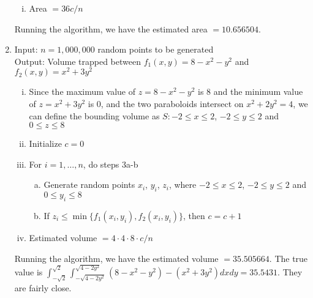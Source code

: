 \documentclass[10pt]{report}
\begin{document}
\begin{enumerate}
\begin{enumerate}[i.]
		\item
		Area $ = 36 c/n$
	\end{enumerate}
	Running the algorithm, we have the estimated area $ = 10.656504$.
	
	\item
	Input: $n=1,000,000$ random points to be generated\\
	Output: Volume trapped between $f_1(x, y) = 8 - x^2 - y^2$ and $f_2(x, y) = x^2 + 3y^2$
	\begin{enumerate}[i.]
		\item
		Since the maximum value of $z=8-x^2-y^2$ is 8 and the minimum value of $z = x^2 + 3y^2$ is 0, and the two paraboloids intersect on $x^2 + 2y^2 = 4$, we can define the bounding volume as $S: -2 \le x \le 2$, $-2 \le y \le 2$ and $0 \le z \le 8$
		
		\item
		Initialize $c=0$
		
		\item
		For $i=1, \dots, n$, do steps 3a-b
		\begin{enumerate}[a.]
			\item 
			Generate random points $x_i$, $y_i$, $z_i$, where $-2 \le x \le 2$, $-2 \le y \le 2$ and $0 \le y_i \le 8$
			
			\item 
			If $z_i \le \min\{f_1(x_i, y_i), f_2(x_i, y_i)\}$, then $c=c+1$
		\end{enumerate}
		
		\item
		Estimated volume $ =  4\cdot 4\cdot 8\cdot c/n$
	\end{enumerate}
	Running the algorithm, we have the estimated volume $ = 35.505664$. The true value is $ \int_{-\sqrt{2}}^{\sqrt{2}} \int_{-\sqrt{4-2y^2}}^{\sqrt{4-2y^2}} (8 - x^2 - y^2) - (x^2 + 3y^2) dx dy = 35.5431$. They are fairly close.
	

\end{enumerate}
\end{document}
